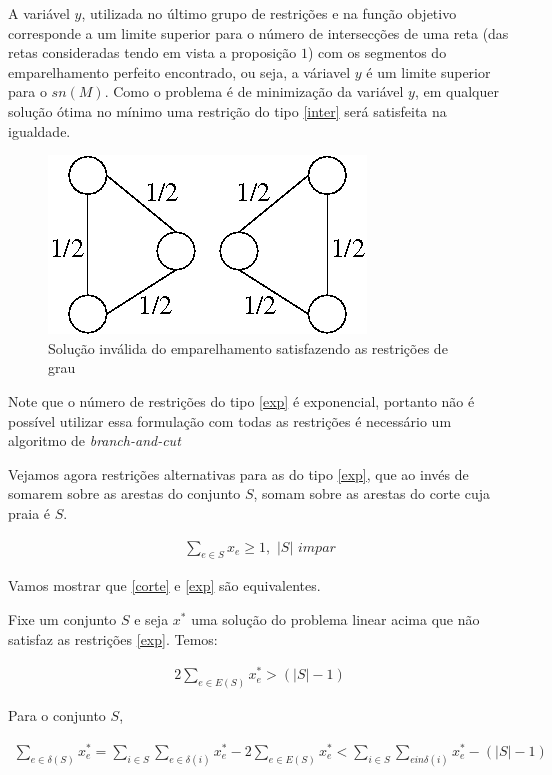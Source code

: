 \documentclass[11pt]{article}
\begin{document}
A variável $y$, utilizada no último grupo de restrições e na função
objetivo corresponde a um limite superior para o número de
intersecções de uma reta (das retas consideradas tendo em vista a
proposição $1$) com os segmentos do emparelhamento perfeito
encontrado, ou seja, a váriavel $y$ é um limite superior para o
$sn(M)$. Como o problema é de minimização da variável $y$, em qualquer
solução ótima no mínimo uma restrição do tipo \eqref{inter} será
satisfeita na igualdade.

\begin{figure}[H]
\centering
\includegraphics[scale=0.50]{ciclos.png}
\caption{Solução inválida do emparelhamento satisfazendo as restrições
  de grau}
\label{fig:ciclo_impar}
\end{figure}

Note que o número de restrições do tipo \eqref{exp} é exponencial,
portanto não é possível utilizar essa formulação com todas as
restrições é necessário um algoritmo de \emph{branch-and-cut}

Vejamos agora restrições alternativas para as do tipo \eqref{exp}, que
ao invés de somarem sobre as arestas do conjunto $S$, somam sobre as
arestas do corte cuja praia é $S$.

\begin{align}
  \sum_{e \in S}{x_e} \ge 1, \hspace{4pt}|S|\hspace{4pt} impar \label{corte}
\end{align}

Vamos mostrar que \eqref{corte} e \eqref{exp} são equivalentes.

Fixe um conjunto $S$ e seja $x^*$ uma solução do problema linear acima
que não satisfaz as restrições \eqref{exp}. Temos:

\begin{align}
  2\sum_{e \in E(S)}x_e^* > (|S| - 1)
\end{align}

Para o conjunto $S$,

\begin{align}
  \sum_{e \in \delta (S)}x_e^* = \sum_{i \in S}\sum_{e \in \delta
    (i)}x_e^* - 2\sum_{e \in E(S)}x_e^* < \sum_{i \in S}\sum_{e in
    \delta (i)}x_e^* - (|S| - 1)
\end{align}
\end{document}
